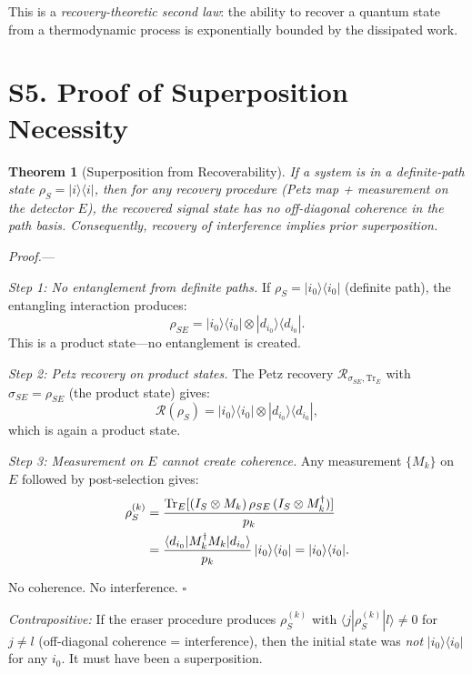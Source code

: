 \documentclass[prl,twocolumn,superscriptaddress,longbibliography]{revtex4-2}
\newtheorem{theorem}{Theorem}
\newcommand{\Tr}{\mathrm{Tr}}
\newcommand{\Petz}{\mathcal{R}}
\newcommand{\ket}[1]{|#1\rangle}
\newcommand{\bra}[1]{\langle#1|}
\begin{document}
This is a \emph{recovery-theoretic second law}: the ability to recover
a quantum state from a thermodynamic process is exponentially bounded by
the dissipated work.

\section{S5. Proof of Superposition Necessity}
\label{sec:superposition}

\begin{theorem}[Superposition from Recoverability]
If a system is in a definite-path state $\rho_S = \ket{i}\bra{i}$, then
for any recovery procedure (Petz map + measurement on the detector $E$),
the recovered signal state has no off-diagonal coherence in the path
basis. Consequently, recovery of interference implies prior
superposition.
\end{theorem}

\emph{Proof.}---

\emph{Step 1: No entanglement from definite paths.}
If $\rho_S = \ket{i_0}\bra{i_0}$ (definite path), the entangling
interaction produces:
\begin{equation}
\rho_{SE} = \ket{i_0}\bra{i_0} \otimes \ket{d_{i_0}}\bra{d_{i_0}}.
\end{equation}
This is a product state---no entanglement is created.

\emph{Step 2: Petz recovery on product states.}
The Petz recovery $\Petz_{\sigma_{SE}, \Tr_E}$ with
$\sigma_{SE} = \rho_{SE}$ (the product state) gives:
\begin{equation}
\Petz(\rho_S) = \ket{i_0}\bra{i_0} \otimes \ket{d_{i_0}}\bra{d_{i_0}},
\end{equation}
which is again a product state.

\emph{Step 3: Measurement on $E$ cannot create coherence.}
Any measurement $\{M_k\}$ on $E$ followed by post-selection gives:
\begin{align}
\rho_S^{(k)} &= \frac{\Tr_E[(I_S \otimes M_k)\,\rho_{SE}\,
  (I_S \otimes M_k^\dagger)]}{p_k} \notag\\
&= \frac{\bra{d_{i_0}}M_k^\dagger M_k\ket{d_{i_0}}}{p_k}\,
  \ket{i_0}\bra{i_0} = \ket{i_0}\bra{i_0}.
\end{align}

No coherence. No interference. \hfill$\square$

\emph{Contrapositive:} If the eraser procedure produces
$\rho_S^{(k)}$ with $\bra{j}\rho_S^{(k)}\ket{l} \neq 0$ for $j \neq l$
(off-diagonal coherence = interference), then the initial state was
\emph{not} $\ket{i_0}\bra{i_0}$ for any $i_0$. It must have been a
superposition.
\end{document}

